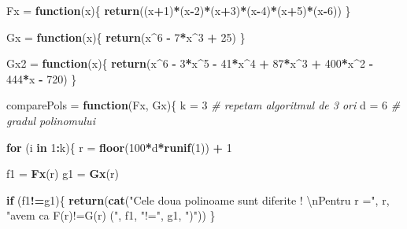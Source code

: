 \documentclass[]{article}
\newenvironment{Shaded}{\begin{snugshade}}{\end{snugshade}}
\newcommand{\KeywordTok}[1]{\textcolor[rgb]{0.13,0.29,0.53}{\textbf{#1}}}
\newcommand{\DecValTok}[1]{\textcolor[rgb]{0.00,0.00,0.81}{#1}}
\newcommand{\CharTok}[1]{\textcolor[rgb]{0.31,0.60,0.02}{#1}}
\newcommand{\StringTok}[1]{\textcolor[rgb]{0.31,0.60,0.02}{#1}}
\newcommand{\CommentTok}[1]{\textcolor[rgb]{0.56,0.35,0.01}{\textit{#1}}}
\newcommand{\ControlFlowTok}[1]{\textcolor[rgb]{0.13,0.29,0.53}{\textbf{#1}}}
\newcommand{\OperatorTok}[1]{\textcolor[rgb]{0.81,0.36,0.00}{\textbf{#1}}}
\newcommand{\NormalTok}[1]{#1}
\begin{document}
\begin{Shaded}
\begin{Highlighting}[]
\NormalTok{Fx =}\StringTok{ }\ControlFlowTok{function}\NormalTok{(x)\{}
  \KeywordTok{return}\NormalTok{((x}\OperatorTok{+}\DecValTok{1}\NormalTok{)}\OperatorTok{*}\NormalTok{(x}\OperatorTok{-}\DecValTok{2}\NormalTok{)}\OperatorTok{*}\NormalTok{(x}\OperatorTok{+}\DecValTok{3}\NormalTok{)}\OperatorTok{*}\NormalTok{(x}\OperatorTok{-}\DecValTok{4}\NormalTok{)}\OperatorTok{*}\NormalTok{(x}\OperatorTok{+}\DecValTok{5}\NormalTok{)}\OperatorTok{*}\NormalTok{(x}\OperatorTok{-}\DecValTok{6}\NormalTok{))}
\NormalTok{\}}

\NormalTok{Gx =}\StringTok{ }\ControlFlowTok{function}\NormalTok{(x)\{}
  \KeywordTok{return}\NormalTok{(x}\OperatorTok{^}\DecValTok{6} \OperatorTok{-}\StringTok{ }\DecValTok{7}\OperatorTok{*}\NormalTok{x}\OperatorTok{^}\DecValTok{3} \OperatorTok{+}\StringTok{ }\DecValTok{25}\NormalTok{)}
\NormalTok{\}}

\NormalTok{Gx2 =}\StringTok{ }\ControlFlowTok{function}\NormalTok{(x)\{}
  \KeywordTok{return}\NormalTok{(x}\OperatorTok{^}\DecValTok{6} \OperatorTok{-}\StringTok{ }\DecValTok{3}\OperatorTok{*}\NormalTok{x}\OperatorTok{^}\DecValTok{5} \OperatorTok{-}\StringTok{ }\DecValTok{41}\OperatorTok{*}\NormalTok{x}\OperatorTok{^}\DecValTok{4} \OperatorTok{+}\StringTok{ }\DecValTok{87}\OperatorTok{*}\NormalTok{x}\OperatorTok{^}\DecValTok{3} \OperatorTok{+}\StringTok{ }\DecValTok{400}\OperatorTok{*}\NormalTok{x}\OperatorTok{^}\DecValTok{2} \OperatorTok{-}\StringTok{ }\DecValTok{444}\OperatorTok{*}\NormalTok{x }\OperatorTok{-}\StringTok{ }\DecValTok{720}\NormalTok{)}
\NormalTok{\}}

\NormalTok{comparePols =}\StringTok{ }\ControlFlowTok{function}\NormalTok{(Fx, Gx)\{}
\NormalTok{  k =}\StringTok{ }\DecValTok{3} \CommentTok{# repetam algoritmul de 3 ori}
\NormalTok{  d =}\StringTok{ }\DecValTok{6} \CommentTok{# gradul polinomului }
  
  \ControlFlowTok{for}\NormalTok{ (i }\ControlFlowTok{in} \DecValTok{1}\OperatorTok{:}\NormalTok{k)\{}
\NormalTok{    r =}\StringTok{ }\KeywordTok{floor}\NormalTok{(}\DecValTok{100}\OperatorTok{*}\NormalTok{d}\OperatorTok{*}\KeywordTok{runif}\NormalTok{(}\DecValTok{1}\NormalTok{)) }\OperatorTok{+}\StringTok{ }\DecValTok{1}
    
\NormalTok{    f1 =}\StringTok{ }\KeywordTok{Fx}\NormalTok{(r)}
\NormalTok{    g1 =}\StringTok{ }\KeywordTok{Gx}\NormalTok{(r)}
    
    \ControlFlowTok{if}\NormalTok{ (f1}\OperatorTok{!=}\NormalTok{g1)\{}
      \KeywordTok{return}\NormalTok{(}\KeywordTok{cat}\NormalTok{(}\StringTok{"Cele doua polinoame sunt diferite ! }\CharTok{\textbackslash{}n}\StringTok{Pentru r ="}\NormalTok{, }
\NormalTok{                         r, }\StringTok{"avem ca F(r)!=G(r) ("}\NormalTok{, f1, }\StringTok{"!="}\NormalTok{, g1, }\StringTok{")"}\NormalTok{))}
\NormalTok{    \}}
    

\end{Highlighting}
\end{Shaded}
\end{document}
